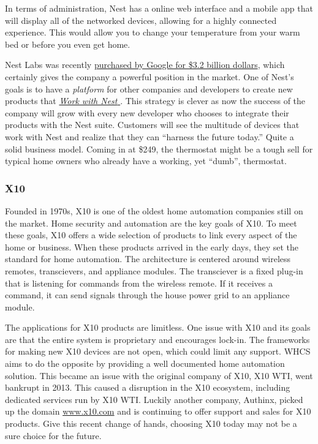 In terms of administration, Nest has a online web interface and a mobile app
that will display all of the networked devices, allowing for a highly connected
experience. This would allow you to change your temperature from your warm bed
or before you even get home.

Nest Labs was recently
\href{http://www.forbes.com/sites/greatspeculations/2014/01/17/googles-strategy-behind-the-3-2-billion-acquisition-of-nest-labs/}{purchased by Google for \$3.2 billion dollars},
which certainly gives the company a powerful position in the market. One of
Nest's goals is to have a \emph{platform} for other companies and developers to
create new products that \href{https://nest.com/works-with-nest/}{\emph{Work with Nest \texttrademark}}. This strategy is
clever as now the success of the company will grow with every new
developer who chooses to integrate their products with the Nest suite.
Customers will see the multitude of devices that work with Nest and realize
that they can ``harness the future today.'' Quite a solid business model.
Coming in at \$249, the thermostat might be a tough sell for typical home owners who
already have a working, yet ``dumb'', thermostat.

\subsubsection{X10}
Founded in 1970s, X10 is one of the oldest home automation companies still on
the market.  Home security and automation are the key goals of X10. To meet
these goals, X10 offers a wide selection of products to link every aspect of
the home or business. When these products arrived in the early days, they set
the standard for home automation. The architecture is centered around wireless
remotes, transcievers, and appliance modules.  The transciever is a fixed
plug-in that is listening for commands from the wireless remote. If it receives
a command, it can send signals through the house power grid to an appliance
module.

The applications for X10 products are limitless. One issue with X10 and its
goals are that the entire system is proprietary and encourages lock-in. The
frameworks for making new X10 devices are not open, which could limit any
support. WHCS aims to do the opposite by providing a well documented home automation solution.
This became an issue with the original company of X10, X10 WTI, went
bankrupt in 2013. This caused a disruption in the X10 ecosystem, including
dedicated services run by X10 WTI. Luckily another company, Authinx, picked up
the domain \url{www.x10.com} and is continuing to offer support and sales for
X10 products. Give this recent change of hands, choosing X10 today may not be a
sure choice for the future.

